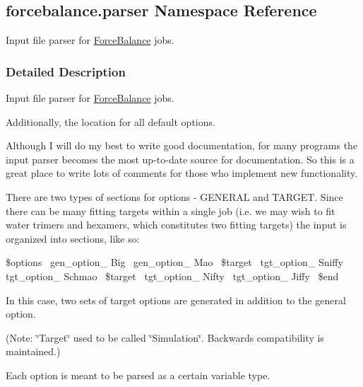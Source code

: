 \hypertarget{namespaceforcebalance_1_1parser}{}\subsection{forcebalance.\+parser Namespace Reference}
\label{namespaceforcebalance_1_1parser}


Input file parser for \hyperlink{namespaceForceBalance}{Force\+Balance} jobs.  




\subsubsection{Detailed Description}
Input file parser for \hyperlink{namespaceForceBalance}{Force\+Balance} jobs. 

Additionally, the location for all default options.

Although I will do my best to write good documentation, for many programs the input parser becomes the most up-\/to-\/date source for documentation. So this is a great place to write lots of comments for those who implement new functionality.

There are two types of sections for options -\/ G\+E\+N\+E\+R\+AL and T\+A\+R\+G\+ET. Since there can be many fitting targets within a single job (i.\+e. we may wish to fit water trimers and hexamers, which constitutes two fitting targets) the input is organized into sections, like so\+:

\$options~\newline
 gen\+\_\+option\+\_ Big~\newline
 gen\+\_\+option\+\_ Mao~\newline
 \$target~\newline
 tgt\+\_\+option\+\_ Sniffy~\newline
 tgt\+\_\+option\+\_ Schmao~\newline
 \$target~\newline
 tgt\+\_\+option\+\_ Nifty~\newline
 tgt\+\_\+option\+\_ Jiffy~\newline
 \$end

In this case, two sets of target options are generated in addition to the general option.

(Note\+: \char`\"{}\+Target\char`\"{} used to be called \char`\"{}\+Simulation\char`\"{}. Backwards compatibility is maintained.)

Each option is meant to be parsed as a certain variable type.


